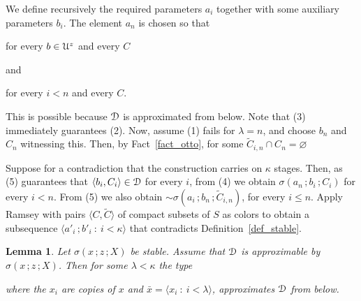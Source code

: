\documentclass{amsproc}
\makeatletter
\newcounter{thm}
\theoremstyle{mio}
\newtheorem{lemma}[thm]{Lemma}\tcolorboxenvironment{lemma}{mythm}
\providecommand{\proofNameStyle}{\bfseries}
\renewenvironment{proof}[1][\proofname]{\par
  \pushQED{\qed}%
  \normalfont%
  \trivlist
  \item[\hskip\labelsep
        \proofNameStyle
    #1\@addpunct{.}]\ignorespaces
}{%
  \popQED\endtrivlist\@endpefalse
}
\makeatother
\begin{document}
\begin{proof}
  We define recursively the required parameters $a_i$ together with some auxiliary parameters $b_i$.
  The element $a_n$ is chosen so that

\hfill for every $b\in{\EuScript U}^z$ and every $C$

and

\hfill for every $i<n$ and every $C$.\smallskip

This is possible because ${\EuScript D}$ is approximated from below.
Note that (3) immediately guarantees (2).
Now, assume (1) fails for $\lambda=n$, and choose $b_n$ and $C_n$ witnessing this.
Then, by Fact~\ref{fact_otto}, for some $\tilde C_{i,n}\cap C_n=\varnothing$


Suppose for a contradiction that the construction carries on $\kappa$ stages.
Then, as (5) guarantees that $\langle b_i,C_i\rangle\in{\EuScript D}$ for every $i$, from (4) we obtain $\sigma(a_n\,;b_i\,;C_i)$ for every $i<n$.
From (5) we also obtain ${\sim}\sigma(a_i\,;b_n\,;\tilde C_{i,n})$, for every $i\le n$.
Apply Ramsey with pairs $\langle C,\tilde C\rangle$ of compact subsets of $S$ as colors to obtain a subsequence $\langle a'_i\,;b'_i\ :\ i<\kappa\rangle$ that contradicts Definition~\ref{def_stable}.
\end{proof}

\begin{lemma}
  Let $\sigma(x\,;z\,;X)$ be stable.
  Assume that ${\EuScript D}$ is approximable by $\sigma(x\,;z\,;X)$.
  Then for some $\lambda<\kappa$ the type\medskip 

  \smallskip
  
  where the $x_i$ are copies of $x$ and $\bar x=\langle x_i\ :\ i<\lambda\rangle$,
  approximates ${\EuScript D}$ from below.
\end{lemma}
\end{document}
